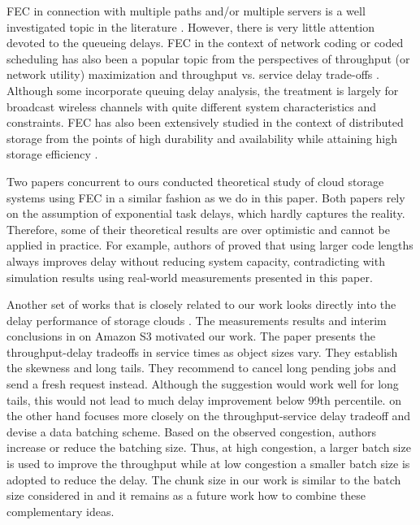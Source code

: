 \documentclass[journal]{IEEEtran}
\begin{document}
FEC in connection with multiple paths and/or multiple servers is a well investigated topic in the literature \cite{VickySharmaMPLOT,EminGabrielyanFEC,JohnByersAccessing,RSaadEvaluating}. However, there is very little attention devoted to the queueing delays. FEC in the context of network coding or coded scheduling has also been a popular topic from the perspectives of throughput (or network utility) maximization and throughput vs. service delay trade-offs \cite{Eryilmaz:2008:DTG:2263482.2273567,Yeownetworkcoding,Theodorosnetworkcoding, KozatScheduling}. Although some incorporate queuing delay analysis, the treatment is largely for broadcast wireless channels with quite different system characteristics and constraints.
FEC has also been extensively studied in the context of distributed storage from the points of high durability and availability while attaining high storage efficiency \cite{Dimakis:2010:NCD:1861840.1861868,Rodrigues_highavailability,Li:2010:TDR:1833515.1833884,ferner2012Allerton}.


Two papers \cite{Longbocodeingincloud,MDS-queue} concurrent to ours conducted theoretical study of cloud storage systems using FEC in a similar fashion as we do in this paper. Both papers rely on the assumption of exponential task delays, which hardly captures the reality. Therefore, some of their theoretical results are over optimistic and  cannot be applied in practice.
For example, authors of \cite{MDS-queue} proved that using larger code lengths always improves delay without reducing system capacity, contradicting with simulation results using real-world measurements presented in this paper.

Another set of works that is closely related to our work looks directly into the delay performance of storage clouds \cite{Garfinkel07anevaluation, stout}. The measurements results and interim conclusions in \cite{Garfinkel07anevaluation} on Amazon S3 motivated our work. The paper presents the throughput-delay tradeoffs in service times as object sizes vary. They establish the skewness and long tails. They recommend to cancel long pending jobs and send a fresh request instead. Although the suggestion would work well for long tails, this would not lead to much delay improvement below 99th percentile.  \cite{stout} on the other hand focuses more closely on the throughput-service delay tradeoff and devise a data batching scheme. Based on the observed congestion, authors increase or reduce the batching size. Thus, at high congestion, a larger batch size is used to improve the throughput while at low congestion a smaller batch size is adopted to reduce the delay.  The chunk size in our work is similar to the batch size considered in  \cite{stout} and it remains as a future work how to combine these complementary ideas.
\end{document}
